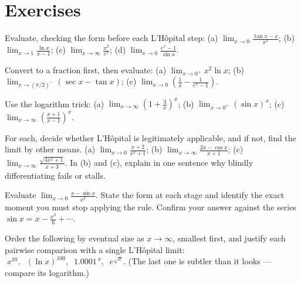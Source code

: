 \section{Exercises}

\begin{exercise}
Evaluate, checking the form before each L'H\^opital step:
(a) $\displaystyle\lim_{x\to 0}\frac{\tan x - x}{x^3}$;\quad
(b) $\displaystyle\lim_{x\to 1}\frac{\ln x}{x-1}$;\quad
(c) $\displaystyle\lim_{x\to\infty}\frac{x^2}{e^{x}}$;\quad
(d) $\displaystyle\lim_{x\to 0}\frac{e^{x}-1}{\sin x}$.
\end{exercise}

\begin{exercise}
Convert to a fraction first, then evaluate:
(a) $\displaystyle\lim_{x\to 0^+}x^2\ln x$;\quad
(b) $\displaystyle\lim_{x\to (\pi/2)^-}(\sec x - \tan x)$;\quad
(c) $\displaystyle\lim_{x\to 0}\left(\frac{1}{x}-\frac{1}{e^x-1}\right)$.
\end{exercise}

\begin{exercise}
Use the logarithm trick:
(a) $\displaystyle\lim_{x\to\infty}\left(1+\frac{3}{x}\right)^{x}$;\quad
(b) $\displaystyle\lim_{x\to 0^+}(\sin x)^{x}$;\quad
(c) $\displaystyle\lim_{x\to\infty}\left(\frac{x+1}{x-1}\right)^{x}$.
\end{exercise}

\begin{exercise}
For each, decide whether L'H\^opital is legitimately applicable, and if not, find the
limit by other means.
(a) $\displaystyle\lim_{x\to 0}\frac{x+2}{x^2+1}$;\quad
(b) $\displaystyle\lim_{x\to\infty}\frac{2x-\cos x}{x+1}$;\quad
(c) $\displaystyle\lim_{x\to\infty}\frac{\sqrt{4x^2+1}}{x+3}$.
In (b) and (c), explain in one sentence why blindly differentiating fails or stalls.
\end{exercise}

\begin{exercise}
Evaluate $\displaystyle\lim_{x\to 0}\frac{x-\sin x}{x^3}$. State the form at each stage
and identify the exact moment you must stop applying the rule. Confirm your answer
against the series $\sin x = x-\tfrac{x^3}{6}+\cdots$.
\end{exercise}

\begin{exercise}
Order the following by eventual size as $x\to\infty$, smallest first, and justify each
pairwise comparison with a single L'H\^opital limit:
$\;x^{10},\;\; (\ln x)^{100},\;\; 1.0001^{\,x},\;\; e^{\sqrt{x}}.$
(The last one is subtler than it looks --- compare its logarithm.)
\end{exercise}

